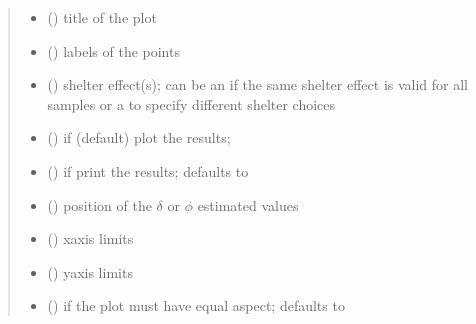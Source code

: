 \documentclass[letterpaper,10pt,english]{sphinxmanual}
\begin{document}
\begin{fulllineitems}
\begin{quote}
\begin{description}
\begin{itemize}
\item {} 
\sphinxAtStartPar
{} () \textendash{} title of the plot

\item {} 
\sphinxAtStartPar
{} () \textendash{} labels of the points

\item {} 
\sphinxAtStartPar
{} () \textendash{} shelter effect(s); can be an  if the same shelter
effect is valid for all samples or a  to specify different
shelter choices

\item {} 
\sphinxAtStartPar
{} () \textendash{} if  (default) plot the results;

\item {} 
\sphinxAtStartPar
{} () \textendash{} if  print the results; defaults to 

\item {} 
\sphinxAtStartPar
{} () \textendash{} position of the \(\delta\) or \(\phi\) estimated values

\item {} 
\sphinxAtStartPar
{} () \textendash{} x\sphinxhyphen{}axis limits

\item {} 
\sphinxAtStartPar
{} () \textendash{} y\sphinxhyphen{}axis limits

\item {} 
\sphinxAtStartPar
{} () \textendash{} if the plot must have equal aspect; defaults to 


\end{itemize}
\end{description}
\end{quote}
\end{fulllineitems}
\end{document}
